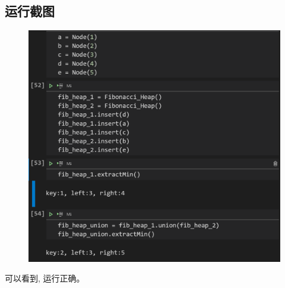 \documentclass{ctexart}[UTF8]
\begin{document}
    \subsection{运行截图}
    \begin{figure}[H]
        \centering
        \includegraphics[width=12cm]{resources/11_1.png}
    \end{figure}
    可以看到, 运行正确。
\end{document}
